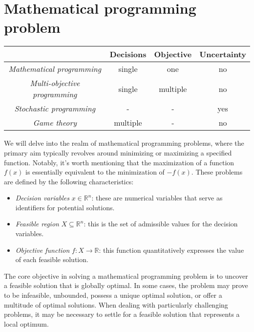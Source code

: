 \section{Mathematical programming problem}

\begin{table}[H]
    \centering
    \begin{tabular}{c|ccc|}
    \cline{2-4}
                                                               & \textbf{Decisions} & \textbf{Objective} & \textbf{Uncertainty} \\ \hline
    \multicolumn{1}{|c|}{\textit{Mathematical programming}}    & single                   & one                          & no                   \\
    \multicolumn{1}{|c|}{\textit{Multi-objective programming}} & single                   & multiple                     & no                   \\
    \multicolumn{1}{|c|}{\textit{Stochastic programming}}      & -                        & -                            & yes                  \\
    \multicolumn{1}{|c|}{\textit{Game theory}}                 & multiple                 & -                            & no                   \\ \hline
    \end{tabular}
\end{table}
We will delve into the realm of mathematical programming problems, where the primary aim typically revolves around minimizing or maximizing a specified function. 
Notably, it's worth mentioning that the maximization of a function $f(x)$ is essentially equivalent to the minimization of $-f(x)$. 
These problems are defined by the following characteristics:
\begin{itemize}
    \item \textit{Decision variables} $x \in \mathbb{R}^n$: these are numerical variables that serve as identifiers for potential solutions.
    \item \textit{Feasible region} $X \subseteq \mathbb{R}^n$: this is the set of admissible values for the decision variables.
    \item \textit{Objective function} $f:X \rightarrow\mathbb{R}$: this function quantitatively expresses the value of each feasible solution.
\end{itemize}
The core objective in solving a mathematical programming problem is to uncover a feasible solution that is globally optimal. 
In some cases, the problem may prove to be infeasible, unbounded, possess a unique optimal solution, or offer a multitude of optimal solutions. 
When dealing with particularly challenging problems, it may be necessary to settle for a feasible solution that represents a local optimum.

